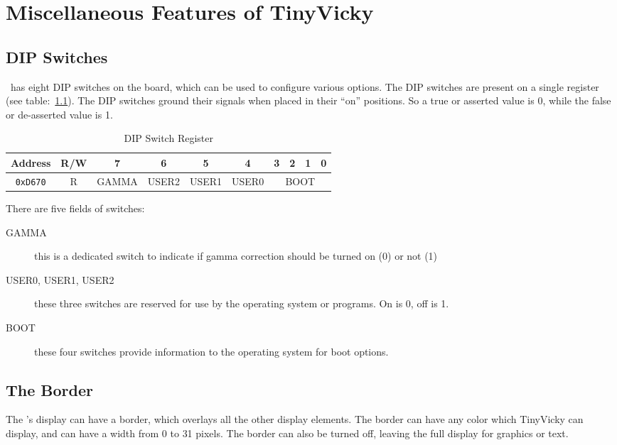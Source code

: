 \chapter{Miscellaneous Features of TinyVicky}

\section{DIP Switches}

\jr\ has eight DIP switches on the board, which can be used to configure various options. The DIP switches are present on a single register (see table:~\ref{tab:dip_reg}). The DIP switches ground their signals when placed in their ``on'' positions. So a true or asserted value is 0, while the false or de-asserted value is 1.

\begin{table}[h]
    \begin{center}
        \begin{tabular}{|c|c|c|c|c|c|c|c|c|c|} \hline
            Address & R/W & 7 & 6 & 5 & 4 & 3 & 2 & 1 & 0 \\\hline\hline
            \verb+0xD670+ & R & GAMMA & USER2 & USER1 & USER0 & \multicolumn{4}{|c|}{BOOT} \\ \hline
        \end{tabular}
    \end{center}
    \caption{DIP Switch Register}
    \label{tab:dip_reg}
\end{table}

There are five fields of switches:
\begin{description}
    \item[GAMMA] this is a dedicated switch to indicate if gamma correction should be turned on (0) or not (1)

    \item[USER0, USER1, USER2] these three switches are reserved for use by the operating system or programs. On is 0, off is 1.

    \item[BOOT] these four switches provide information to the operating system for boot options.
\end{description}

\section{The Border}

The \jr's display can have a border, which overlays all the other display elements. The border can have any color which TinyVicky can display, and can have a width from 0 to 31 pixels. The border can also be turned off, leaving the full display for graphics or text.

